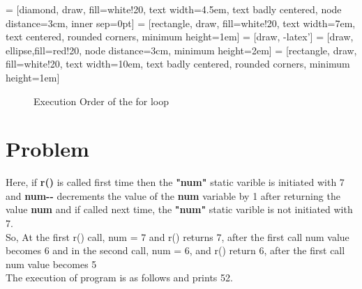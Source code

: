 \documentclass[journal,12pt,twocolumn]{IEEEtran}
\begin{document}
 = [diamond, draw, fill=white!20, 
    text width=4.5em, text badly centered, node distance=3cm, inner sep=0pt]
 = [rectangle, draw, fill=white!20, 
    text width=7em, text centered, rounded corners, minimum height=1em]
 = [draw, -latex']
 = [draw, ellipse,fill=red!20, node distance=3cm,
    minimum height=2em]
 = [rectangle, draw, fill=white!20, 
    text width=10em, text badly centered, rounded corners, minimum height=1em]


\begin{figure}[!h]
\centering
{}
\caption{Execution Order of the for loop} \label{fig:M1}
\end{figure}


\section{Problem}
Here, if \textbf{r()} is called first time then the \textbf{"num"} static varible is initiated with 7 and \textbf{num-{}-} decrements the value of the \textbf{num} variable by 1 after returning the value \textbf{num} and if called next time, the \textbf{"num"} static varible is not initiated with 7.
\\
So, At the first r() call, num = 7 and r() returns 7, after the first call num value becomes 6 
and in the second call, num = 6, and r() return 6, after the first call num value becomes 5
\\
The execution of program is as follows and prints 52.
\end{document}
